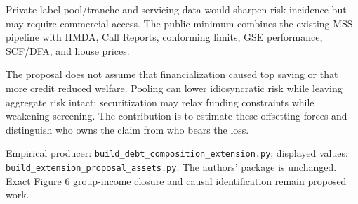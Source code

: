 Private-label pool/tranche and servicing data would sharpen risk incidence but
may require commercial access. The public minimum combines the existing MSS
pipeline with HMDA, Call Reports, conforming limits, GSE performance, SCF/DFA,
and house prices.


The proposal does not assume that financialization caused top saving or that
more credit reduced welfare. Pooling can lower idiosyncratic risk while leaving
aggregate risk intact; securitization may relax funding constraints while
weakening screening. The contribution is to estimate these offsetting forces
and distinguish who owns the claim from who bears the loss.

\vfill
{\color{MSSGray}\scriptsize\raggedright
Empirical producer: \texttt{build\_debt\_composition\_extension.py}; displayed
values: \texttt{build\_extension\_proposal\_assets.py}. The authors' package is
unchanged. Exact Figure 6 group-income closure and causal identification remain
proposed work.}
